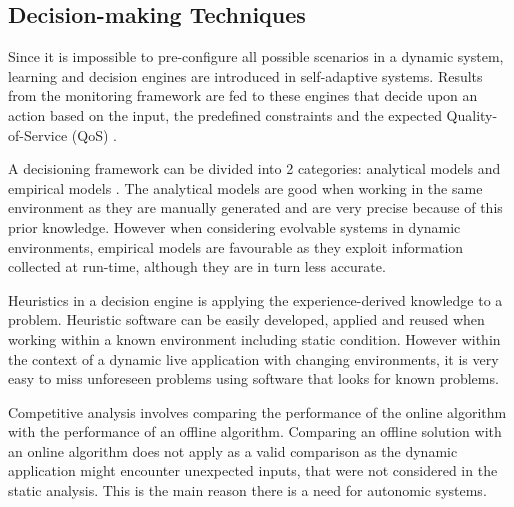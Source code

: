 \subsection{Decision-making Techniques}
\label{sec:decisions}
%
Since it is impossible to pre-configure all possible scenarios in a dynamic system, learning and decision engines are introduced in self-adaptive systems. Results from the monitoring framework are fed to these engines that decide upon an action based on the input, the predefined constraints and the expected Quality-of-Service (QoS) \cite{evolvable}. 

A decisioning framework can be divided into 2 categories: analytical models and empirical models \cite{evolvable}. The analytical models are good when working in the same environment as they are manually generated and are very precise because of this prior knowledge. However when considering evolvable systems in dynamic environments, empirical models are favourable as they exploit information collected at run-time, although they are in turn less accurate.

Heuristics in a decision engine is applying the experience-derived knowledge to a problem. Heuristic software can be easily developed, applied and reused when working within a known environment including static condition. However within the context of a dynamic live application with changing environments, it is very easy to miss unforeseen problems using software that looks for known problems. %

Competitive analysis involves comparing the performance of the online algorithm with the performance of an offline algorithm. Comparing an offline solution with an online algorithm does not apply as a valid comparison as the dynamic application might encounter unexpected inputs, that were not considered in the static analysis. This is the main reason there is a need for autonomic systems. 
%

